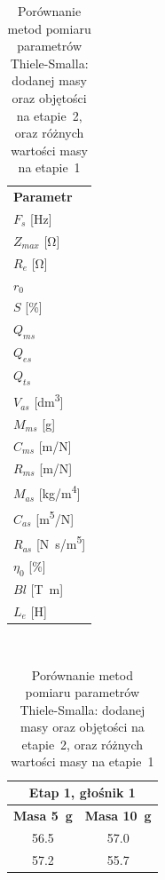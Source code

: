 \documentclass[12pt]{oska}
\begin{document}
	\begin{table}[!ht]
		\centering
		\caption{Porównanie metod pomiaru parametrów Thiele-Smalla: dodanej masy oraz objętości na etapie~2, oraz różnych wartości masy na etapie~1}
		\label{t:TS_metody}
		\boldmath
		\begin{tabular}{|l|}
			\hline
			\multirow{2}{*}{\textbf{Parametr}} 	\\
			\\\hline
			\hline                              							
			$F_s$ [\si{\hertz}] \\\hline
			$Z_{max}$ [\si{\ohm}] \\\hline
			$R_e$ [\si{\ohm}] \\\hline
			$r_0$ \\\hline
			$S$ [\%]\\\hline
			\hline                              							
			$Q_{ms}$ 	\\\hline
			$Q_{es}$ \\\hline	
			$Q_{ts}$ \\\hline
			\hline                                                  		
			$V_{as}$ [\si{\deci\metre\cubed}] \\\hline
			$M_{ms}$ [\si{\gram}] 	\\\hline
			$C_{ms}$ [\si[per-mode=symbol]{\metre\per\newton}] 	\\\hline
			$R_{ms}$ [\si[per-mode=symbol]{\metre\per\newton}] 	\\\hline
			\hline
			$M_{as}$ [\si[per-mode=symbol]{\kilo\gram\per\metre\tothe{4}}] 	\\\hline
			$C_{as}$ [\si[per-mode=symbol]{\metre\tothe{5}\per\newton}] \\\hline	
			$R_{as}$ [\si[per-mode=symbol]{\newton\s\per\metre\tothe{5}}] 	\\\hline
			\hline
			$\eta_0$ [\%] 	\\\hline
			$Bl$ [\si{\tesla\metre}]	\\\hline
			$L_{e}$ [\si{\henry}] 	\\\hline
		\end{tabular}
		\unboldmath
		~ \quad
		\begin{tabular}{|c|c|}
			\hline
			\multicolumn{2}{|c|}{\textbf{Etap 1, głośnik 1}} \\\hline
			\textbf{Masa \SI{5}{\gram}} & \textbf{Masa \SI{10}{\gram}} \\\hline
			\hline
			\num{56,5} 	& \num{57,0} 	 \\\hline
			\num{57,2} 	& \num{55,7} 	 \\\hline

\end{tabular}
\end{table}
\end{document}
